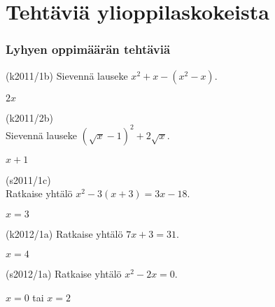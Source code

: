 \section{Tehtäviä ylioppilaskokeista}


\subsubsection*{Lyhyen oppimäärän tehtäviä}


\begin{tehtava}
(k2011/1b) Sievennä lauseke $x^2+x-(x^2-x)$.
\begin{vastaus}
$2x$
\end{vastaus}
\end{tehtava}

\begin{tehtava}
(k2011/2b) \\ Sievennä lauseke $(\sqrt{x}-1)^2+2\sqrt{x}$.
\begin{vastaus}
$x+1$
\end{vastaus}
\end{tehtava}

\begin{tehtava}
(s2011/1c) \\ Ratkaise yhtälö $x^2-3(x+3) = 3x-18$.
\begin{vastaus}
$x=3$
\end{vastaus}
\end{tehtava}

\begin{tehtava}
(k2012/1a) Ratkaise yhtälö $7x+3 = 31$.
\begin{vastaus}
$x = 4$
\end{vastaus}
\end{tehtava}

\begin{tehtava}
(s2012/1a) Ratkaise yhtälö $x^2-2x = 0$.
\begin{vastaus}
$x=0$ tai $x=2$
\end{vastaus}
\end{tehtava}

